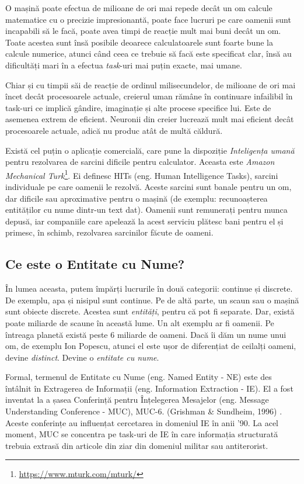 O mașină poate efectua de milioane de ori mai repede decât un om calcule matematice cu o precizie impresionantă, poate face lucruri pe care oamenii sunt incapabili să le facă, poate avea timpi de reacție mult mai buni decât un om. Toate acestea sunt însă posibile deoarece calculatoarele sunt foarte bune la calcule numerice, atunci când ceea ce trebuie să facă este specificat clar, însă au dificultăți mari în a efectua \textit{task}-uri mai puțin exacte, mai umane.

Chiar și cu timpii săi de reacție de ordinul milisecundelor, de milioane de ori mai încet decât procesoarele actuale, creierul uman rămâne în continuare infailibil în task-uri ce implică gândire, imaginație și alte procese specifice lui. Este de asemenea extrem de eficient. Neuronii din creier lucrează mult mai eficient decât procesoarele actuale, adică nu produc atât de multă căldură.

Există cel puțin o aplicație comercială, care pune la dispoziție \textit{Inteligența umană} pentru rezolvarea de sarcini dificile pentru calculator. Aceasta este \textit{Amazon Mechanical Turk}\footnote{\url{https://www.mturk.com/mturk/}}. Ei definesc HITs (eng. Human Intelligence Tasks), sarcini individuale pe care oamenii le rezolvă. Aceste sarcini sunt banale pentru un om, dar dificile sau aproximative pentru o mașină (de exemplu: recunoașterea entităților cu nume dintr-un text dat). Oamenii sunt remunerați pentru munca depusă, iar companiile care apelează la acest serviciu plătesc bani pentru el și primesc, în schimb, rezolvarea sarcinilor făcute de oameni.

\subsection{Ce este o Entitate cu Nume?}

În lumea aceasta, putem împărți lucrurile în două categorii: continue și discrete. De exemplu, apa și nisipul sunt continue. Pe de altă parte, un scaun sau o mașină sunt obiecte discrete. Acestea sunt \textit{entități}, pentru că pot fi separate. Dar, există poate miliarde de scaune în această lume. Un alt exemplu ar fi oamenii. Pe întreaga planetă există peste 6 miliarde de oameni. Dacă îi dăm un nume unui om, de exemplu Ion Popescu, atunci el este ușor de diferențiat de ceilalți oameni, devine \textit{distinct}. Devine o \textit{entitate cu nume}.

Formal, termenul de Entitate cu Nume (eng. Named Entity - NE) este des întâlnit în Extragerea de Informații (eng. Information Extraction - IE). El a fost inventat la a șasea Conferință pentru Înțelegerea Mesajelor (eng. Message Understanding Conference - MUC), MUC-6. (Grishman \& Sundheim, 1996) \cite{grishman1996}. Aceste conferințe au influențat cercetarea in domeniul IE în anii '90. La acel moment, MUC se concentra pe task-uri de IE în care informația structurată trebuia extrasă din articole din ziar din domeniul militar sau antiterorist.

